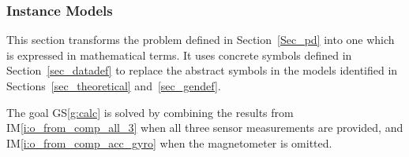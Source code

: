 \documentclass[12pt]{article}
\newcommand{\colAwidth}{0.13\textwidth}
\newcommand{\colBwidth}{0.82\textwidth}
\newcommand{\gsref}[1]{GS\ref{#1}} \newcounter{instnum} %
\newcommand{\iref}[1]{IM\ref{#1}} \newcounter{reqnum} %
\begin{document}



\subsubsection{Instance Models} \label{sec_instance}    


This section transforms the problem defined in Section~\ref{Sec_pd} into one which is expressed in
mathematical terms. It uses concrete symbols defined in Section~\ref{sec_datadef} to replace the
abstract symbols in the models identified in Sections~\ref{sec_theoretical} and~\ref{sec_gendef}.

The goal \gsref{g:calc} is solved by combining the results from \iref{i:o_from_comp_all_3} when all
three sensor measurements are provided, and \iref{i:o_from_comp_acc_gyro} when the magnetometer is
omitted. 
\end{document}
